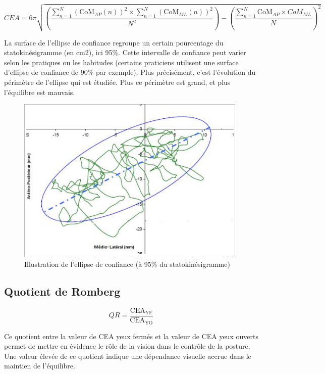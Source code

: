 \begin{equation}
CEA= 6\pi \sqrt{ \left ( \frac{\sum_{n=1}^{N} \left (\text{CoM}_{AP}(n) \right)^2 \times \sum_{n=1}^{N} \left ( \text{CoM}_{ML}(n) \right)^2}{N^2} \right ) - \left (\frac{\sum_{n=1}^N \text{CoM}_{AP} \times CoM_{ML}}{N} \right)^2}
\label{eq:CEA}
\end{equation}

La surface de l'ellipse de confiance regroupe un certain pourcentage du statokinésigramme (en cm2), ici 95\%. 
Cette intervalle de confiance peut varier selon les pratiques ou les habitudes (certains praticiens utilisent une surface d'ellipse de confiance de 90\% par exemple). 
Plus précisément, c'est l'évolution du périmètre de l'ellipse qui est étudiée. 
Plus ce périmètre est grand, et plus l'équilibre est mauvais.

\begin{figure}[H]
    \centering
    \includegraphics[height=8cm]{images/methode/ellipse_confiance_95.png}
    \caption{Illustration de l'ellipse de confiance (à 95\% du statokinésigramme)}\label{fig:ellipse_confiance}
\end{figure}

\subsection{Quotient de Romberg}

\begin{equation}
  QR = \frac{\text{CEA}_{\text{YF}}}{\text{CEA}_{\text{YO}}}
  \label{eq:QR}
\end{equation}

Ce quotient entre la valeur de CEA yeux fermés et la valeur de CEA yeux ouverts permet de mettre en évidence le rôle de la vision dans le contrôle de la posture. 
Une valeur élevée de ce quotient indique une dépendance visuelle accrue dans le maintien de l'équilibre.

